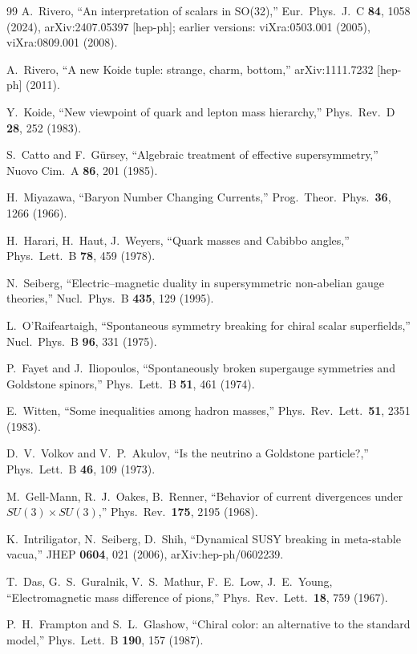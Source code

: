 \documentclass[12pt,a4paper]{article}
\begin{document}
\begin{thebibliography}{99}
A.~Rivero, ``An interpretation of scalars in SO(32),''
Eur.\ Phys.\ J.\ C \textbf{84}, 1058 (2024),
arXiv:2407.05397 [hep-ph]; earlier versions: viXra:0503.001 (2005),
viXra:0809.001 (2008).

A.~Rivero, ``A new Koide tuple: strange, charm, bottom,'' 
arXiv:1111.7232 [hep-ph] (2011).

Y.~Koide, ``New viewpoint of quark and lepton mass hierarchy,'' 
Phys.\ Rev.\ D \textbf{28}, 252 (1983).

S.~Catto and F.~G\"ursey, ``Algebraic treatment of effective 
supersymmetry,'' Nuovo Cim.\ A \textbf{86}, 201 (1985).

H.~Miyazawa, ``Baryon Number Changing Currents,'' 
Prog.\ Theor.\ Phys.\ \textbf{36}, 1266 (1966).

H.~Harari, H.~Haut, J.~Weyers, ``Quark masses and Cabibbo 
angles,'' Phys.\ Lett.\ B \textbf{78}, 459 (1978).

N.~Seiberg, ``Electric--magnetic duality in supersymmetric 
non-abelian gauge theories,'' Nucl.\ Phys.\ B \textbf{435}, 129 
(1995).

L.~O'Raifeartaigh, ``Spontaneous symmetry breaking for chiral 
scalar superfields,'' Nucl.\ Phys.\ B \textbf{96}, 331 (1975).

P.~Fayet and J.~Iliopoulos, ``Spontaneously broken supergauge 
symmetries and Goldstone spinors,'' Phys.\ Lett.\ B \textbf{51}, 
461 (1974).

E.~Witten, ``Some inequalities among hadron masses,'' 
Phys.\ Rev.\ Lett.\ \textbf{51}, 2351 (1983).

D.~V.~Volkov and V.~P.~Akulov, ``Is the neutrino a Goldstone 
particle?,'' Phys.\ Lett.\ B \textbf{46}, 109 (1973).

M.~Gell-Mann, R.~J.~Oakes, B.~Renner, ``Behavior of current 
divergences under $SU(3) \times SU(3)$,'' 
Phys.\ Rev.\ \textbf{175}, 2195 (1968).

K.~Intriligator, N.~Seiberg, D.~Shih, ``Dynamical SUSY breaking 
in meta-stable vacua,'' JHEP \textbf{0604}, 021 (2006),
arXiv:hep-ph/0602239.

T.~Das, G.~S.~Guralnik, V.~S.~Mathur, F.~E.~Low, J.~E.~Young,
``Electromagnetic mass difference of pions,''
Phys.\ Rev.\ Lett.\ \textbf{18}, 759 (1967).

P.~H.~Frampton and S.~L.~Glashow, ``Chiral color: an alternative 
to the standard model,'' Phys.\ Lett.\ B \textbf{190}, 157 (1987).

\end{thebibliography}
\end{document}
